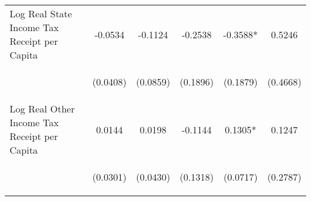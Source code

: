 \begin{center}
\begin{tabular}{lccccc}
\noalign{\smallskip}Log Real State Income Tax Receipt per Capita & \begin{scriptsize}-0.0534\end{scriptsize} & \begin{scriptsize}-0.1124\end{scriptsize} & \begin{scriptsize}-0.2538\end{scriptsize} & \begin{scriptsize}-0.3588*\end{scriptsize} & \begin{scriptsize}0.5246\end{scriptsize}\\
 & \begin{scriptsize}(0.0408)\end{scriptsize} & \begin{scriptsize}(0.0859)\end{scriptsize} & \begin{scriptsize}(0.1896)\end{scriptsize} & \begin{scriptsize}(0.1879)\end{scriptsize} & \begin{scriptsize}(0.4668)\end{scriptsize}\\
\noalign{\smallskip}Log Real Other Income Tax Receipt per Capita & \begin{scriptsize}0.0144\end{scriptsize} & \begin{scriptsize}0.0198\end{scriptsize} & \begin{scriptsize}-0.1144\end{scriptsize} & \begin{scriptsize}0.1305*\end{scriptsize} & \begin{scriptsize}0.1247\end{scriptsize}\\
 & \begin{scriptsize}(0.0301)\end{scriptsize} & \begin{scriptsize}(0.0430)\end{scriptsize} & \begin{scriptsize}(0.1318)\end{scriptsize} & \begin{scriptsize}(0.0717)\end{scriptsize} & \begin{scriptsize}(0.2787)\end{scriptsize}\\

\end{tabular}
\end{center}
